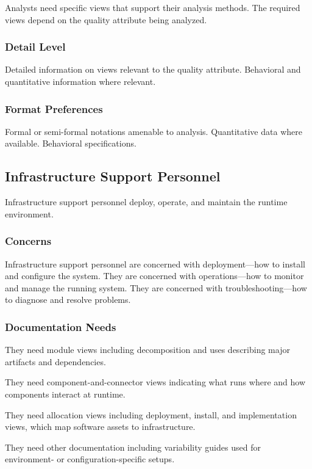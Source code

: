 \documentclass[11pt]{article}
\begin{document}
Analysts need specific views that support their analysis methods. The required views depend on the quality attribute being analyzed.

\subsubsection{Detail Level}

Detailed information on views relevant to the quality attribute. Behavioral and quantitative information where relevant.

\subsubsection{Format Preferences}

Formal or semi-formal notations amenable to analysis. Quantitative data where available. Behavioral specifications.

\subsection{Infrastructure Support Personnel}

Infrastructure support personnel deploy, operate, and maintain the runtime environment.

\subsubsection{Concerns}

Infrastructure support personnel are concerned with deployment---how to install and configure the system. They are concerned with operations---how to monitor and manage the running system. They are concerned with troubleshooting---how to diagnose and resolve problems.

\subsubsection{Documentation Needs}

They need module views including decomposition and uses describing major artifacts and dependencies.

They need component-and-connector views indicating what runs where and how components interact at runtime.

They need allocation views including deployment, install, and implementation views, which map software assets to infrastructure.

They need other documentation including variability guides used for environment- or configuration-specific setups.
\end{document}

